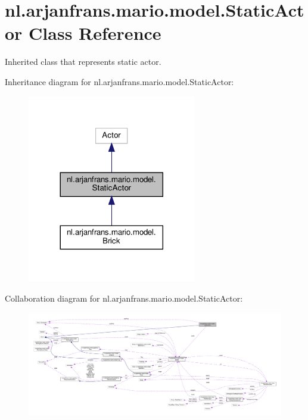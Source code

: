 \hypertarget{classnl_1_1arjanfrans_1_1mario_1_1model_1_1StaticActor}{}\section{nl.\+arjanfrans.\+mario.\+model.\+Static\+Actor Class Reference}
\label{classnl_1_1arjanfrans_1_1mario_1_1model_1_1StaticActor}


Inherited class that represents static actor.  




Inheritance diagram for nl.\+arjanfrans.\+mario.\+model.\+Static\+Actor\+:
\nopagebreak
\begin{figure}[H]
\begin{center}
\leavevmode
\includegraphics[width=209pt]{classnl_1_1arjanfrans_1_1mario_1_1model_1_1StaticActor__inherit__graph}
\end{center}
\end{figure}


Collaboration diagram for nl.\+arjanfrans.\+mario.\+model.\+Static\+Actor\+:
\nopagebreak
\begin{figure}[H]
\begin{center}
\leavevmode
\includegraphics[width=350pt]{classnl_1_1arjanfrans_1_1mario_1_1model_1_1StaticActor__coll__graph}
\end{center}
\end{figure}
